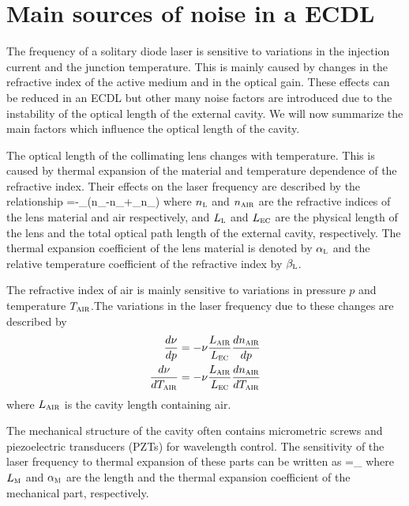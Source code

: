 	\section{Main sources of noise in a ECDL}
The frequency of a solitary diode laser is sensitive to variations in the injection current and the junction temperature. This is mainly caused by changes in the refractive index of the active medium and in the optical gain. 
These effects can be reduced in an ECDL but other many noise factors are introduced due to the instability of the optical length of the external cavity.
We will now summarize the main factors which influence the optical length of the cavity.

The optical length of the collimating lens changes with temperature. This is caused by thermal expansion of the material and temperature dependence of the refractive index. Their effects on the laser frequency are described by the relationship 
\mate
{}=-\nu{}\alpha_{}\left(n_{}-n_{}+\beta_{}n_{}\right)
\label{effect1}
\atem
where $n_{\mbox{\footnotesize{\scshape{l}}}}$ and $n_{\mbox{\footnotesize{\scshape{air}}}}$ are the refractive indices of the lens material and air respectively, and $L_{\mbox{\footnotesize{\scshape{l}}}}$ and $L_{\mbox{\footnotesize{\scshape{ec}}}}$ are the physical length of the lens and the total optical path length of the external cavity, respectively. The thermal expansion coefficient of the lens material is denoted by $\alpha_{\mbox{\footnotesize{\scshape{l}}}}$ and the relative temperature coefficient of the refractive index by $\beta_{\mbox{\footnotesize{\scshape{l}}}}$. 

The refractive index of air is mainly sensitive to variations in pressure $p$ and temperature $T_{\mbox{\footnotesize{\scshape{air}}}}$.The variations in the laser frequency due to these changes are described by
\begin{align}
\frac{d\nu}{dp}=-\nu\frac{L_{\mbox{\footnotesize{\scshape{air}}}}}{L_{\mbox{\footnotesize{\scshape{ec}}}}}\frac{dn_{\mbox{\footnotesize{\scshape{air}}}}}{dp}\label{effect2}\\
\frac{d\nu}{dT_{\mbox{\footnotesize{\scshape{air}}}}}=-\nu\frac{L_{\mbox{\footnotesize{\scshape{air}}}}}{L_{\mbox{\footnotesize{\scshape{ec}}}}}\frac{dn_{\mbox{\footnotesize{\scshape{air}}}}}{dT_{\mbox{\footnotesize{\scshape{air}}}}}
\label{effect3}
\end{align}
where $L_{\mbox{\footnotesize{\scshape{air}}}}$ is the cavity length containing air.	

The mechanical structure of the cavity often contains micrometric screws and piezoelectric transducers (PZTs) for wavelength control. The sensitivity of the laser frequency to thermal expansion of these parts can be written as
\mate
{}=\pm\nu{}\alpha_{}
\label{effect4}
\atem
where $L_{\mbox{\footnotesize{\scshape{m}}}}$ and $\alpha_{\mbox{\footnotesize{\scshape{m}}}}$ are the length and the thermal expansion coefficient of the mechanical part, respectively.

